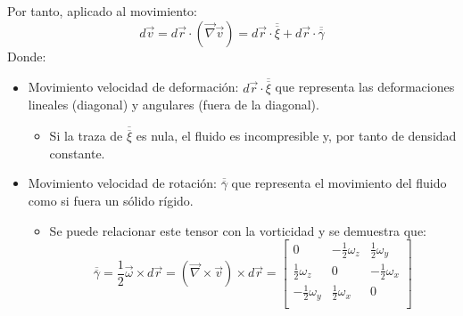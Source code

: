 Por tanto, aplicado al movimiento:
\[d\vec{v}=d\vec{r}\cdot(\vec{\nabla}\vec{v})=d\vec{r}\cdot\overline{\overline{\xi}}+d\vec{r}\cdot\overline{\overline{\gamma}}\]
Donde:
\begin{itemize}
	\item Movimiento velocidad de deformación: $d\vec{r}\cdot\overline{\overline{\xi}}$ que representa las deformaciones lineales (diagonal) y angulares (fuera de la diagonal).
	\begin{itemize}
		\item Si la traza de $\overline{\overline{\xi}}$ es nula, el fluido es incompresible y, por tanto de densidad constante.
	\end{itemize}
	\item Movimiento velocidad de rotación: $\overline{\overline{\gamma}}$ que representa el movimiento del fluido como si fuera un sólido rígido.
	\begin{itemize}
		\item Se puede relacionar este tensor con la vorticidad y se demuestra que:
		\[\overline{\overline{\gamma}} =\frac{1}{2}\vec{\omega}\times d \vec{r}=\left(\vec{\nabla}\times\vec{v}\right)\times d \vec{r}=\begin{bmatrix}
			0 & -\frac{1}{2}\omega_z & \frac{1}{2}\omega_y \\
			\frac{1}{2}\omega_z & 0 & -\frac{1}{2}\omega_x\\	
			-\frac{1}{2}\omega_y & \frac{1}{2}\omega_x & 0 \\
		\end{bmatrix}\]
	\end{itemize}
\end{itemize}
